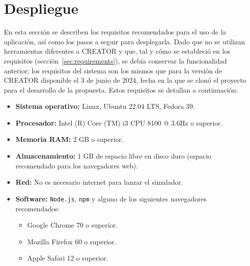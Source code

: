 \section{Despliegue}\label{sec:deploy}

En esta sección se describen los requisitos recomendados para el uso de la aplicación, así como los pasos a seguir para desplegarla. Dado que no se utilizan herramientas diferentes a CREATOR y que, tal y cómo se estableció en los requisitos (sección~\ref{sec:requirements}), se debía conservar la funcionalidad anterior; los requisitos del sistema son los mismos que para la versión de CREATOR disponible el 3 de junio de 2024, fecha en la que se clonó el proyecto para el desarrollo de la propuesta. Estos requisitos se detallan a continuación:

\begin{itemize}
    \item \textbf{Sistema operativo:} Linux, Ubuntu 22.04 LTS, Fedora 39.
    \item \textbf{Procesador:} Intel (R) Core (TM) i3 CPU 8100 @ 3.6Hz o superior.
    \item \textbf{Memoria RAM:} 2 GB o superior.
    \item \textbf{Almacenamiento:} 1 GB de espacio libre en disco duro (espacio recomendado para los navegadores web).
    \item \textbf{Red:} No es necesario internet para lanzar el simulador.
    \item \textbf{Software:} \texttt{Node.js}, \texttt{npm} y alguno de los siguientes navegadores recomendados:
    \begin{itemize}
        \item Google Chrome 70 o superior.
        \item Mozilla Firefox 60 o superior.
        \item Apple Safari 12 o superior.
    \end{itemize}

\end{itemize}

